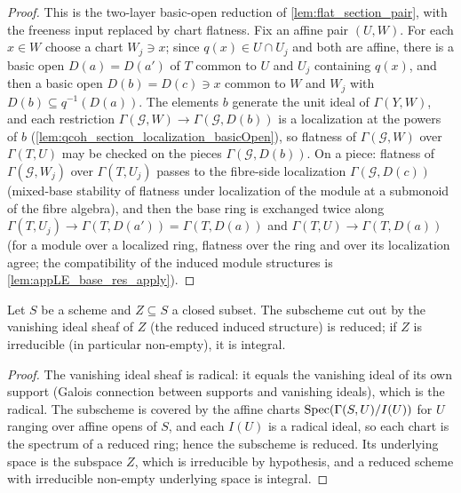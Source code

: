 \begin{proof}
  \leanok
  This is the two-layer basic-open reduction of
  \cref{lem:flat_section_pair}, with the freeness input replaced by chart
  flatness.  Fix an affine pair \((U, W)\).  For each \(x \in W\) choose a
  chart \(W_j \ni x\); since \(q(x) \in U \cap U_j\) and both are affine,
  there is a basic open \(D(a) = D(a')\) of \(T\) common to \(U\) and
  \(U_j\) containing \(q(x)\), and then a basic open
  \(D(b) = D(c) \ni x\) common to \(W\) and \(W_j\) with
  \(D(b) \subseteq q^{-1}(D(a))\).  The elements \(b\) generate the unit
  ideal of \(\Gamma(Y, W)\), and each restriction
  \(\Gamma(\mathcal G, W) \to \Gamma(\mathcal G, D(b))\) is a localization at the powers of
  \(b\) (\cref{lem:qcoh_section_localization_basicOpen}), so flatness of
  \(\Gamma(\mathcal G, W)\) over \(\Gamma(T, U)\) may be checked on the pieces
  \(\Gamma(\mathcal G, D(b))\).  On a piece: flatness of \(\Gamma(\mathcal G, W_j)\) over
  \(\Gamma(T, U_j)\) passes to the fibre-side localization
  \(\Gamma(\mathcal G, D(c))\) (mixed-base stability of flatness under localization
  of the module at a submonoid of the fibre algebra), and then the base ring
  is exchanged twice along
  \(\Gamma(T, U_j) \to \Gamma(T, D(a')) = \Gamma(T, D(a))\) and
  \(\Gamma(T, U) \to \Gamma(T, D(a))\) (for a module over a localized ring,
  flatness over the ring and over its localization agree; the compatibility
  of the induced module structures is \cref{lem:appLE_base_res_apply}).
\end{proof}

\begin{lemma}

\leanok
  \label{lem:vanishing_ideal_subscheme_integral}
  Let \(S\) be a scheme and \(Z \subseteq S\) a closed subset.  The
  subscheme cut out by the vanishing ideal sheaf of \(Z\) (the reduced
  induced structure) is reduced; if \(Z\) is irreducible (in particular
  non-empty), it is integral.
\end{lemma}

\begin{proof}
  \leanok
  The vanishing ideal sheaf is radical: it equals the vanishing ideal of
  its own support (Galois connection between supports and vanishing
  ideals), which is the radical.  The subscheme is covered by the affine
  charts \(\operatorname{Spec}(\Gamma(S, U)/I(U))\) for \(U\) ranging over affine opens
  of \(S\), and each \(I(U)\) is a radical ideal, so each chart is the
  spectrum of a reduced ring; hence the subscheme is reduced.  Its
  underlying space is the subspace \(Z\), which is irreducible by
  hypothesis, and a reduced scheme with irreducible non-empty underlying
  space is integral.
\end{proof}

